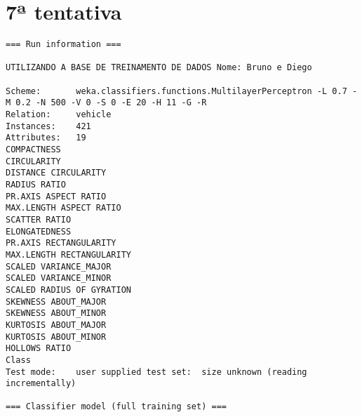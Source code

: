 \documentclass[
	article,			%
	11pt,				%
	oneside,			%
	a4paper,			%
	english,			%
	brazil,				%
	sumario=tradicional
	]{abntex2}
\begin{document}
\section{7ª tentativa}

\begin{lstlisting}
=== Run information ===

UTILIZANDO A BASE DE TREINAMENTO DE DADOS Nome: Bruno e Diego

Scheme:       weka.classifiers.functions.MultilayerPerceptron -L 0.7 -M 0.2 -N 500 -V 0 -S 0 -E 20 -H 11 -G -R
Relation:     vehicle
Instances:    421
Attributes:   19
COMPACTNESS
CIRCULARITY
DISTANCE CIRCULARITY
RADIUS RATIO
PR.AXIS ASPECT RATIO
MAX.LENGTH ASPECT RATIO
SCATTER RATIO
ELONGATEDNESS
PR.AXIS RECTANGULARITY
MAX.LENGTH RECTANGULARITY
SCALED VARIANCE_MAJOR
SCALED VARIANCE_MINOR
SCALED RADIUS OF GYRATION
SKEWNESS ABOUT_MAJOR
SKEWNESS ABOUT_MINOR
KURTOSIS ABOUT_MAJOR
KURTOSIS ABOUT_MINOR
HOLLOWS RATIO
Class
Test mode:    user supplied test set:  size unknown (reading incrementally)

=== Classifier model (full training set) ===


\end{lstlisting}
\end{document}
